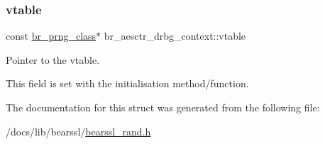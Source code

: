 \subsubsection{\texorpdfstring{vtable}{vtable}}
{\footnotesize\ttfamily const \hyperlink{bearssl__rand_8h_a249aef3beeba050eea56048e6a479fba}{br\+\_\+prng\+\_\+class}$\ast$ br\+\_\+aesctr\+\_\+drbg\+\_\+context\+::vtable}



Pointer to the vtable. 

This field is set with the initialisation method/function. 

The documentation for this struct was generated from the following file\+:\begin{DoxyCompactItemize}
\item 
/docs/lib/bearssl/\hyperlink{bearssl__rand_8h}{bearssl\+\_\+rand.\+h}\end{DoxyCompactItemize}
